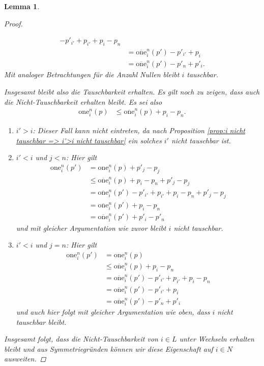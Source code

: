 \documentclass[12pt]{article}
\newtheorem{lem}[thm]{Lemma}
\begin{document}
\begin{lem}
\begin{proof}
\begin{enumerate}
\begin{align*}
- p'_{i'} + p_{i'}
 + p_i-p_n
\\
&=
\overline{\mathrm{one}}_i^n(p')
-p'_{i'} + p_{i}
\\
&=
\overline{\mathrm{one}}_i^n(p')
-p'_{n} + p'_{i}.
\end{align*}
Mit analoger Betrachtungen für die Anzahl Nullen bleibt $i$ tauschbar.
\end{enumerate}
Insgesamt bleibt also die Tauschbarkeit erhalten. Es gilt noch zu zeigen, dass auch die Nicht-Tauschbarkeit erhalten bleibt. Es sei also
\begin{align*}
\mathrm{one}_i^{n}(p)
&\leq
\overline{\mathrm{one}}_i^{n}(p)
+
p_i-p_n.
\end{align*}
\begin{enumerate}
\item
$i'>i$: Dieser Fall kann nicht eintreten, da nach Proposition \ref{prop:i nicht tauschbar => i'>i nicht tauschbar} ein solches $i'$ nicht tauschbar ist.

\item
$i'<i$ und $j<n$:
Hier gilt
\begin{align*}
\mathrm{one}_{i}^{n}(p')
&=
\mathrm{one}_{i}^{n}(p)
+ p'_j - p_j
\\
&\leq
\overline{\mathrm{one}}_i^{n}(p)
+ p_i - p_n
+ p'_j - p_j
\\
&=
\overline{\mathrm{one}}_i^{n}(p')
-p'_{i'} + p_{i'}
+ p_i - p_n
+ p'_j - p_j
\\
&=
\overline{\mathrm{one}}_i^{n}(p')
+ p_i - p_n
\\
&=
\overline{\mathrm{one}}_i^{n}(p')
+ p'_i - p'_n
\end{align*}
und mit gleicher Argumentation wie zuvor bleibt $i$ nicht tauschbar.

\item $i'<i$ und $j=n$:
Hier gilt
\begin{align*}
\mathrm{one}_{i}^{n}(p')
&=
\mathrm{one}_{i}^{n}(p)
\\
&\leq
\overline{\mathrm{one}}_i^{n}(p)
+ p_i - p_n
\\
&=
\overline{\mathrm{one}}_i^{n}(p')
-p'_{i'} + p_{i'}
+ p_i - p_n
\\
&=
\overline{\mathrm{one}}_i^{n}(p')
-p'_{i'} + p_i 
\\
&=
\overline{\mathrm{one}}_i^{n}(p')
- p'_n + p'_i
\end{align*}
und auch hier folgt mit gleicher Argumentation wie oben, dass $i$ nicht tauschbar bleibt.
\end{enumerate}
Insgesamt folgt, dass die Nicht-Tauschbarkeit von $i\in L$ unter Wechseln erhalten bleibt und aus Symmetriegründen können wir diese Eigenschaft auf $i\in N$ ausweiten.
\end{proof}

\label{lem:einmal tauschbar immer tauschbar}
\end{lem}
\end{document}
